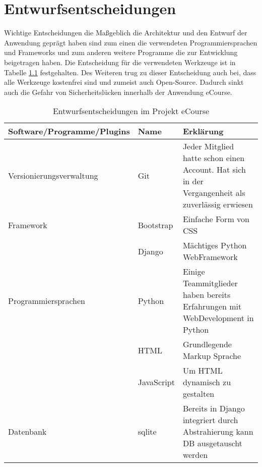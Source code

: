 \chapter{Entwurfsentscheidungen}
Wichtige Entscheidungen die Maßgeblich die Architektur und den Entwurf der Anwendung geprägt haben sind zum einen die verwendeten Programmiersprachen und \gls{Framework}s und zum anderen weitere Programme die zur Entwicklung beigetragen haben.
Die Entscheidung für die verwendeten Werkzeuge ist in Tabelle \ref{tab:Entwurfsentscheidungen} festgehalten. Des Weiteren trug zu dieser Entscheidung auch bei, dass alle Werkzeuge kostenfrei sind und zumeist auch Open-Source. Dadurch sinkt auch die Gefahr von Sicherheitslücken innerhalb der Anwendung eCourse.

\begin{table}
\centering
\begin{tabularx}{\textwidth}{|l|l|X|} 
 \hline 
Software/Programme/Plugins & Name & Erklärung \\ 
\hline
Versionierungsverwaltung & Git & Jeder Mitglied hatte schon einen Account. Hat sich in der Vergangenheit als zuverlässig erwiesen \\ 
\hline
Framework & Bootstrap & Einfache Form von CSS \\ 
\hline
 & Django & Mächtiges Python WebFramework \\ 
\hline
Programmiersprachen & Python & Einige Teammitglieder haben bereits Erfahrungen mit WebDevelopment in Python \\ 
\hline
 & HTML & Grundlegende Markup Sprache  \\ 
\hline
 & JavaScript & Um HTML dynamisch zu gestalten \\ 
\hline
Datenbank & sqlite & Bereits in Django integriert durch Abstrahierung kann DB ausgetauscht werden \\ 
\hline
\end{tabularx}
\caption{Entwurfsentscheidungen im Projekt eCourse}
\label{tab:Entwurfsentscheidungen}
\end{table}
